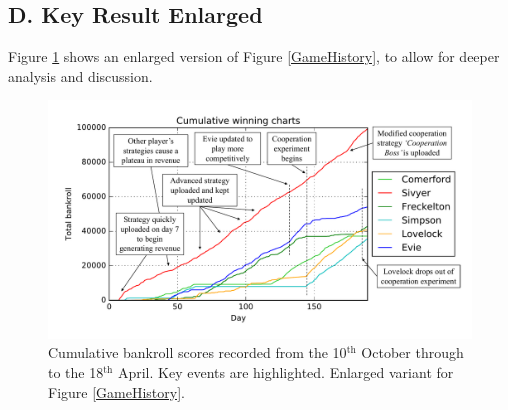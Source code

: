 \documentclass[11pt, twoside]{article}
\begin{document}
\subsection*{D. Key Result Enlarged}

Figure \ref{GameHistoryENLARGED} shows an enlarged version of Figure \ref{GameHistory}, to allow for deeper analysis and discussion.

\begin{figure}[h]
	\centering
	\includegraphics[width=0.9\textheight, keepaspectratio, angle=90]{HistoryOfReport.pdf}
	\caption{Cumulative bankroll scores recorded from the 10$^{\text{th}}$ October through to the 18$^{\text{th}}$ April. Key events are highlighted. Enlarged variant for Figure \ref{GameHistory}.}
	\label{GameHistoryENLARGED}
\end{figure}
\end{document}
